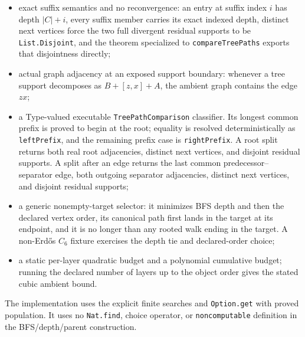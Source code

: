 \documentclass[11pt]{article}
\begin{document}
\begin{itemize}
\texttt{compareTreePaths}: the scan returns a literal common prefix and two
residual lists, proves both exact decompositions, and certifies that either one
residual is empty or both begin with distinct next vertices; the common word is
a literal prefix of each input, and the head-by-head scan has a static linear
budget;
\item exact suffix semantics and no reconvergence: an entry at suffix index
$i$ has depth $|C|+i$, every suffix member carries its exact indexed depth,
distinct next vertices force the two full divergent residual supports to be
\texttt{List.Disjoint}, and the theorem specialized to
\texttt{compareTreePaths} exports that disjointness directly;
\item actual graph adjacency at an exposed support boundary: whenever a tree
support decomposes as
$B\mathbin{+}[z,x]\mathbin{+}A$, the ambient graph contains the edge $zx$;
\item a Type-valued executable \texttt{TreePathComparison} classifier.  Its
longest common prefix is proved to begin at the root; equality is resolved
deterministically as \texttt{leftPrefix}, and the remaining prefix case is
\texttt{rightPrefix}.  A root split returns both real root adjacencies,
distinct next vertices, and disjoint residual supports.  A split after an
edge returns the last common predecessor--separator edge, both outgoing
separator adjacencies, distinct next vertices, and disjoint residual supports;
\item a generic nonempty-target selector: it minimizes BFS depth and then the
declared vertex order, its canonical path first lands in the target at its
endpoint, and it is no longer than any rooted walk ending in the target.  A
non-Erdős $C_6$ fixture exercises the depth tie and declared-order choice;
\item a static per-layer quadratic budget and a polynomial cumulative budget;
running the declared number of layers up to the object order gives the stated
cubic ambient bound.
\end{itemize}
The implementation uses the explicit finite searches and \texttt{Option.get}
with proved population.  It uses no \texttt{Nat.find}, choice operator, or
\texttt{noncomputable} definition in the BFS/depth/parent construction.
\end{document}

